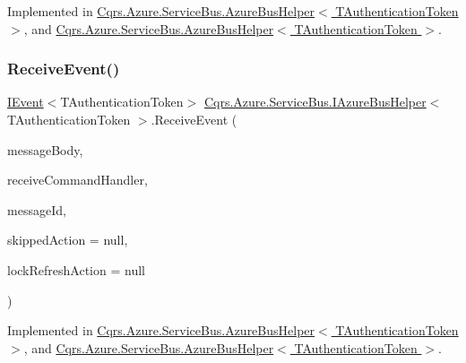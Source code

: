 Implemented in \hyperlink{classCqrs_1_1Azure_1_1ServiceBus_1_1AzureBusHelper_a8aaa5e94b5928cac567f78b351213498}{Cqrs.\+Azure.\+Service\+Bus.\+Azure\+Bus\+Helper$<$ T\+Authentication\+Token $>$}, and \hyperlink{classCqrs_1_1Azure_1_1ServiceBus_1_1AzureBusHelper_a8aaa5e94b5928cac567f78b351213498}{Cqrs.\+Azure.\+Service\+Bus.\+Azure\+Bus\+Helper$<$ T\+Authentication\+Token $>$}.

\mbox{\label{interfaceCqrs_1_1Azure_1_1ServiceBus_1_1IAzureBusHelper_a435d1d63e37ea149087f254f4b73b94a}} 
\subsubsection{\texorpdfstring{Receive\+Event()}{ReceiveEvent()}}
{\footnotesize\ttfamily \hyperlink{interfaceCqrs_1_1Events_1_1IEvent}{I\+Event}$<$T\+Authentication\+Token$>$ \hyperlink{interfaceCqrs_1_1Azure_1_1ServiceBus_1_1IAzureBusHelper}{Cqrs.\+Azure.\+Service\+Bus.\+I\+Azure\+Bus\+Helper}$<$ T\+Authentication\+Token $>$.Receive\+Event (\begin{DoxyParamCaption}\item[{string}]{message\+Body,  }\item[{Func$<$ \hyperlink{interfaceCqrs_1_1Events_1_1IEvent}{I\+Event}$<$ T\+Authentication\+Token $>$, bool?$>$}]{receive\+Command\+Handler,  }\item[{string}]{message\+Id,  }\item[{Action}]{skipped\+Action = {\ttfamily null},  }\item[{Action}]{lock\+Refresh\+Action = {\ttfamily null} }\end{DoxyParamCaption})}



Implemented in \hyperlink{classCqrs_1_1Azure_1_1ServiceBus_1_1AzureBusHelper_ae25e1c5b54e32e79d37bbcd2fd73c70d}{Cqrs.\+Azure.\+Service\+Bus.\+Azure\+Bus\+Helper$<$ T\+Authentication\+Token $>$}, and \hyperlink{classCqrs_1_1Azure_1_1ServiceBus_1_1AzureBusHelper_ae25e1c5b54e32e79d37bbcd2fd73c70d}{Cqrs.\+Azure.\+Service\+Bus.\+Azure\+Bus\+Helper$<$ T\+Authentication\+Token $>$}.

